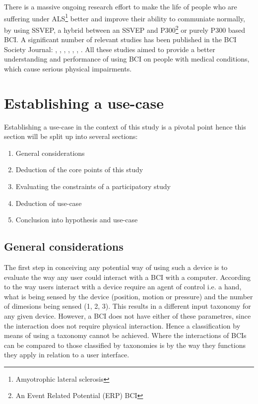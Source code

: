             There is a massive ongoing research effort to make the life of people who are suffering under ALS\footnote{Amyotrophic lateral sclerosis} better and improve their ability to communiate normally, by using SSVEP, a hybrid between an SSVEP and P300\footnote{An Event Related Potential (ERP) BCI} or purely P300 based BCI. A significant number of relevant studies has been published in the BCI Society Journal: \cite{Sugata.2016}, \cite{Holz.2015}, \cite{Speier.2017}, \cite{Geronimo.2017}, \cite{Speier.2018}, \cite{Mowla.2017}, \cite{Huggins.2016}. All these studies aimed to provide a better understanding and performance of using BCI on people with medical conditions, which cause serious physical impairments.

        \section{Establishing a use-case}\label{use-case-main}

            Establishing a use-case in the context of this study is a pivotal point hence this section will be split up into several sections: 

            \begin{enumerate}
                \item General considerations
                \item Deduction of the core points of this study
                \item Evaluating the constraints of a participatory study
                \item Deduction of use-case
                \item Conclusion into hypothesis and use-case
            \end{enumerate}

            \subsection{General considerations}

                The first step in conceiving any potential way of using such a device is to evaluate the way any user could interact with a BCI with a computer. According to \cite[4.13]{Buxton.2010} the way users interact with a device require an agent of control i.e. a hand, what is being sensed by the device (position, motion or pressure) and the number of dimesions being sensed (1, 2, 3). This results in a different input taxonomy for any given device. However, a BCI does not have either of these parametres, since the interaction does not require physical interaction. Hence a classification by means of using a taxonomy cannot be achieved. Where the interactions of BCIs can be compared to those classified by taxonomies is by the way they functions they apply in relation to a user interface.

